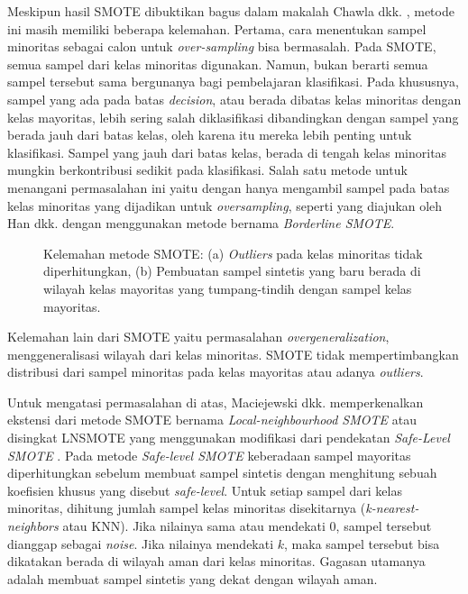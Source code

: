 Meskipun hasil SMOTE dibuktikan bagus dalam makalah Chawla dkk.
\cite{chawla2002smote}, metode ini masih memiliki beberapa kelemahan.
Pertama, cara menentukan sampel minoritas sebagai calon untuk
\textit{over-sampling} bisa bermasalah.
Pada SMOTE, semua sampel dari kelas minoritas digunakan.
Namun, bukan berarti semua sampel tersebut sama bergunanya bagi pembelajaran
klasifikasi.
Pada khususnya, sampel yang ada pada batas \textit{decision}, atau berada
dibatas kelas minoritas dengan kelas mayoritas, lebih sering salah
diklasifikasi dibandingkan dengan sampel yang berada jauh dari batas kelas,
oleh karena itu mereka lebih penting untuk klasifikasi.
Sampel yang jauh dari batas kelas, berada di tengah kelas minoritas mungkin
berkontribusi sedikit pada klasifikasi.
Salah satu metode untuk menangani permasalahan ini yaitu dengan hanya
mengambil sampel pada batas kelas minoritas yang dijadikan untuk
\textit{oversampling}, seperti yang diajukan oleh
Han dkk. \cite{han2005borderline} dengan menggunakan metode bernama
\textit{Borderline SMOTE}.

\begin{figure}[htbp]
\centering
\setlength\fboxsep{4pt}
	\caption{
Kelemahan metode SMOTE:
(a) \textit{Outliers} pada kelas minoritas tidak diperhitungkan,
(b) Pembuatan sampel sintetis yang baru berada di wilayah kelas mayoritas
yang tumpang-tindih dengan sampel kelas mayoritas.
	}
	\label{fig:smote-problems}
\end{figure}

Kelemahan lain dari SMOTE yaitu permasalahan \textit{overgeneralization},
menggeneralisasi wilayah dari kelas minoritas.
SMOTE tidak mempertimbangkan distribusi dari sampel minoritas pada kelas
mayoritas atau adanya \textit{outliers}.

Untuk mengatasi permasalahan di atas, Maciejewski dkk. memperkenalkan ekstensi
dari metode SMOTE bernama \textit{Local-neighbourhood SMOTE} atau disingkat
LNSMOTE \cite{maciejewski2011local} yang menggunakan modifikasi dari
pendekatan \textit{Safe-Level SMOTE} \cite{bunkhumpornpat2009safe}.
Pada metode \textit{Safe-level SMOTE} keberadaan sampel mayoritas
diperhitungkan sebelum membuat sampel sintetis dengan menghitung sebuah
koefisien khusus yang disebut \textit{safe-level}.
Untuk setiap sampel dari kelas minoritas, dihitung jumlah sampel kelas
minoritas disekitarnya (\textit{k-nearest-neighbors} atau KNN).
Jika nilainya sama atau mendekati $ 0 $, sampel tersebut dianggap sebagai
\textit{noise}.
Jika nilainya mendekati $ k $, maka sampel tersebut bisa dikatakan berada
di wilayah aman dari kelas minoritas.
Gagasan utamanya adalah membuat sampel sintetis yang dekat dengan wilayah aman.

